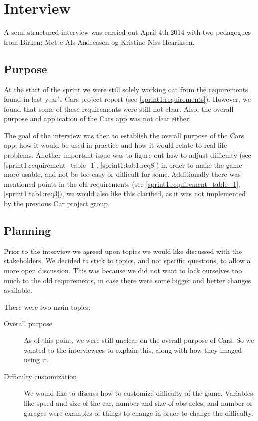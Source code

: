 \section{Interview}\label{s2interview}
A semi-structured interview \cite{deb} was carried out April 4th 2014 with two pedagogues from Birken; Mette Als Andreasen og Kristine Niss Henriksen.

\subsection{Purpose}
At the start of the sprint we were still solely working out from the requirements found in last year's Cars project report (see \cref{sprint1:requirements}).
However, we found that some of these requirements were still not clear.
Also, the overall purpose and application of the Cars app was not clear either.

The goal of the interview was then to establish the overall purpose of the Cars app; how it would be used in practice and how it would relate to real-life problems.
Another important issue was to figure out how to adjust difficulty (see \cref{sprint1:requirement_table_1}, \cref{sprint1:tab1:req8}) in order to make the game more usable, and not be too easy or difficult for some.
Additionally there was mentioned points in the old requirements (see \cref{sprint1:requirement_table_1}, \cref{sprint1:tab1:req3}), we would also like this clarified, as it was not implemented by the previous Car project group.

\subsection{Planning}
Prior to the interview we agreed upon topics we would like discussed with the stakeholders.
We decided to stick to topics, and not specific questions, to allow a more open discussion.
This was because we did not want to lock ourselves too much to the old requirements, in case there were some bigger and better changes available.

There were two main topics; 

\begin{description}
\item[Overall purpose] As of this point, we were still unclear on the overall purpose of Cars.
So we wanted to the interviewees to explain this, along with how they imaged using it.

\item[Difficulty customization] We would like to discuss how to customize difficulty of the game. 
Variables like speed and size of the car, number and size of obstacles, and number of garages were examples of things to change in order to change the difficulty.
\end{description}

